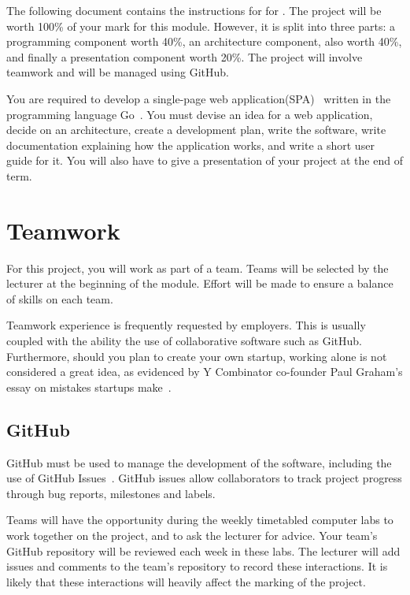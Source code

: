 \noindent
The following document contains the instructions for \projectname{} for \modulename{}.
The project will be worth 100\% of your mark for this module.
However, it is split into three parts: a programming component worth 40\%, an architecture component, also worth 40\%, and finally a presentation component worth 20\%.
The project will involve teamwork and will be managed using GitHub.

You are required to develop a single-page web application(SPA)~\cite{gowebapp} written in the programming language Go~\cite{golang}.
You must devise an idea for a web application, decide on an architecture, create a development plan, write the software, write documentation explaining how the application works, and write a short user guide for it.
You will also have to give a presentation of your project at the end of term.

\section*{Teamwork}
For this project, you will work as part of a team.
Teams will be selected by the lecturer at the beginning of the module.
Effort will be made to ensure a balance of skills on each team.

Teamwork experience is frequently requested by employers.
This is usually coupled with the ability the use of collaborative software such as GitHub.
Furthermore, should you plan to create your own startup, working alone is not considered a great idea, as evidenced by Y Combinator co-founder Paul Graham's essay on mistakes startups make~\cite{paulgrahammistakes}.

\subsection*{GitHub}
GitHub must be used to manage the development of the software, including the use of GitHub Issues~\cite{githubissues}.
GitHub issues allow collaborators to track project progress through bug reports, milestones and labels.

Teams will have the opportunity during the weekly timetabled computer labs to work together on the project, and to ask the lecturer for advice.
Your team's GitHub repository will be reviewed each week in these labs.
The lecturer will add issues and comments to the team's repository to record these interactions.
It is likely that these interactions will heavily affect the marking of the project.

